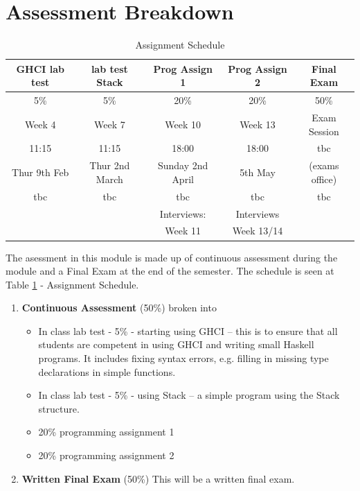\documentclass{article}
\begin{document}
\section{Assessment Breakdown} 
\begin{table}
\begin{center}
    \begin{tabular}{|  c | c | c | c| c |}
        \hline
        \rowcolor{green!50}
        GHCI lab test  & lab test Stack & Prog Assign 1 & Prog Assign 2 & Final Exam \\  
    
    \hline
    \rowcolor{green!20!yellow!40}
    5\% & 5\% & 20\% & 20\% & 50\% \\ 
    \rowcolor{red!60}
    Week 4 & Week 7 & Week 10 & Week 13 & Exam Session \\ 
     \hline
     \rowcolor{red!60}
    11:15 & 11:15 & 18:00 & 18:00 & tbc  \\ 
    
     \rowcolor{red!60}
    Thur 9th Feb & Thur 2nd March & Sunday 2nd April & 5th May & (exams office) \\ 
     \hline
     \rowcolor{red!60}
     tbc & tbc & tbc  & tbc & tbc \\ 
     \hline
     \rowcolor{blue!40}
    
     & & Interviews:&Interviews &\\ 
     \rowcolor{blue!40}
     & & Week 11 &Week 13/14  &\\ 


     \hline
  
    \end{tabular}
    \caption{Assignment Schedule}
    \label{tab:ass-schedule}   
    
\end{center}
\end{table}
The asessment in this module is made up of continuous assessment during the module and a Final Exam at the end of the semester. 
The schedule is seen at Table \ref{tab:ass-schedule} - Assignment Schedule. 
\begin{enumerate}

    \item  \textbf{Continuous Assessment} (50\%) broken into 
    \begin{itemize}
        \item In class lab test - 5\% - starting using GHCI – this is to ensure that all students are competent in using GHCI and writing small Haskell programs. It includes fixing syntax errors, e.g. filling in missing type declarations in simple functions.
        \item In class lab test - 5\% - using Stack – a simple program using the Stack structure.
        \item  20\% programming assignment 1
        \item  20\% programming assignment 2 
    \end{itemize}
    \item \textbf{Written Final Exam} (50\%) This will be a written final exam. 
\end{enumerate}
\end{document}
